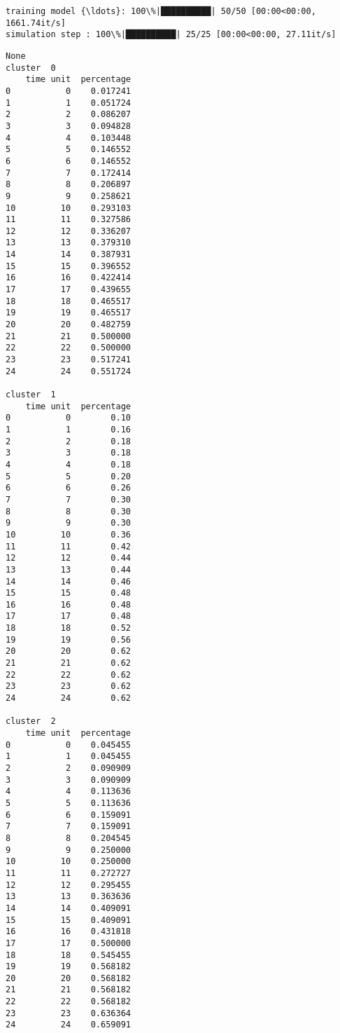\documentclass[11pt]{article}
\begin{document}
    \begin{Verbatim}[commandchars=\\\{\}]
training model {\ldots}: 100\%|██████████| 50/50 [00:00<00:00, 1661.74it/s]
simulation step : 100\%|██████████| 25/25 [00:00<00:00, 27.11it/s]
    \end{Verbatim}

    \begin{Verbatim}[commandchars=\\\{\}]
None
cluster  0
    time unit  percentage
0           0    0.017241
1           1    0.051724
2           2    0.086207
3           3    0.094828
4           4    0.103448
5           5    0.146552
6           6    0.146552
7           7    0.172414
8           8    0.206897
9           9    0.258621
10         10    0.293103
11         11    0.327586
12         12    0.336207
13         13    0.379310
14         14    0.387931
15         15    0.396552
16         16    0.422414
17         17    0.439655
18         18    0.465517
19         19    0.465517
20         20    0.482759
21         21    0.500000
22         22    0.500000
23         23    0.517241
24         24    0.551724

cluster  1
    time unit  percentage
0           0        0.10
1           1        0.16
2           2        0.18
3           3        0.18
4           4        0.18
5           5        0.20
6           6        0.26
7           7        0.30
8           8        0.30
9           9        0.30
10         10        0.36
11         11        0.42
12         12        0.44
13         13        0.44
14         14        0.46
15         15        0.48
16         16        0.48
17         17        0.48
18         18        0.52
19         19        0.56
20         20        0.62
21         21        0.62
22         22        0.62
23         23        0.62
24         24        0.62

cluster  2
    time unit  percentage
0           0    0.045455
1           1    0.045455
2           2    0.090909
3           3    0.090909
4           4    0.113636
5           5    0.113636
6           6    0.159091
7           7    0.159091
8           8    0.204545
9           9    0.250000
10         10    0.250000
11         11    0.272727
12         12    0.295455
13         13    0.363636
14         14    0.409091
15         15    0.409091
16         16    0.431818
17         17    0.500000
18         18    0.545455
19         19    0.568182
20         20    0.568182
21         21    0.568182
22         22    0.568182
23         23    0.636364
24         24    0.659091


\end{Verbatim}
\end{document}
